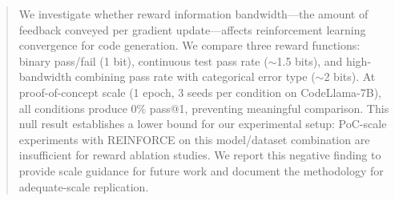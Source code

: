 \begin{abstract}
We investigate whether reward information bandwidth---the amount of feedback conveyed per gradient update---affects reinforcement learning convergence for code generation. We compare three reward functions: binary pass/fail (1 bit), continuous test pass rate ($\sim$1.5 bits), and high-bandwidth combining pass rate with categorical error type ($\sim$2 bits). At proof-of-concept scale (1 epoch, 3 seeds per condition on CodeLlama-7B), all conditions produce 0\% pass@1, preventing meaningful comparison. This null result establishes a lower bound for our experimental setup: PoC-scale experiments with REINFORCE on this model/dataset combination are insufficient for reward ablation studies. We report this negative finding to provide scale guidance for future work and document the methodology for adequate-scale replication.
\end{abstract}
